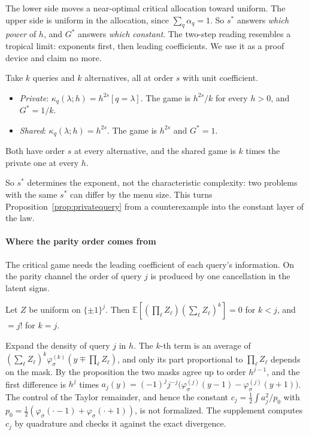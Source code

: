 The lower side moves a near-optimal critical allocation toward uniform. The upper side is
uniform in the allocation, since $\sum_q\alpha_q=1$. So $s^*$ answers \emph{which power} of
$h$, and $G^*$ answers \emph{which constant}. The two-step reading resembles a tropical
limit: exponents first, then leading coefficients. We use it as a proof device and claim no
more.

\begin{proposition}
\label{prop:sameorder}
Take $k$ queries and $k$ alternatives, all at order $s$ with unit coefficient.
\begin{itemize}
\item \emph{Private}: $\kappa_q(\lambda;h)=h^{2s}[q=\lambda]$. The game is $h^{2s}/k$ for every
$h>0$, and $G^*=1/k$.
\item \emph{Shared}: $\kappa_q(\lambda;h)=h^{2s}$. The game is $h^{2s}$ and $G^*=1$.
\end{itemize}
Both have order $s$ at every alternative, and the shared game is $k$ times the private one at
every $h$.
\end{proposition}

So $s^*$ determines the exponent, not the characteristic complexity: two problems with the same
$s^*$ can differ by the menu size. This turns Proposition~\ref{prop:privatequery} from a
counterexample into the constant layer of the law.

\paragraph{Where the parity order comes from} The critical game needs the leading coefficient of
each query's information. On the parity channel the order of query $j$ is produced by one
cancellation in the latent signs.

\begin{proposition}
\label{prop:paritymoment}
Let $Z$ be uniform on $\{\pm1\}^j$. Then $\mathbb E[(\prod_\ell Z_\ell)(\sum_\ell Z_\ell)^k]=0$ for
$k<j$, and $=j!$ for $k=j$.
\end{proposition}

Expand the density of query $j$ in $h$. The $k$-th term is an average of
$(\sum_\ell Z_\ell)^k\varphi_\sigma^{(k)}(y\mp\prod_\ell Z_\ell)$, and only its part proportional to
$\prod_\ell Z_\ell$ depends on the mask. By the proposition the two masks agree up to order
$h^{j-1}$, and the first difference is $h^j$ times
$a_j(y)=(-1)^jj^{-j}\bigl(\varphi_\sigma^{(j)}(y-1)-\varphi_\sigma^{(j)}(y+1)\bigr)$. The control of
the Taylor remainder, and hence the constant
$c_j=\frac12\int a_j^2/p_0$ with $p_0=\frac12(\varphi_\sigma(\cdot-1)+\varphi_\sigma(\cdot+1))$,
is not formalized. The supplement computes $c_j$ by quadrature and checks it against the exact
divergence.

